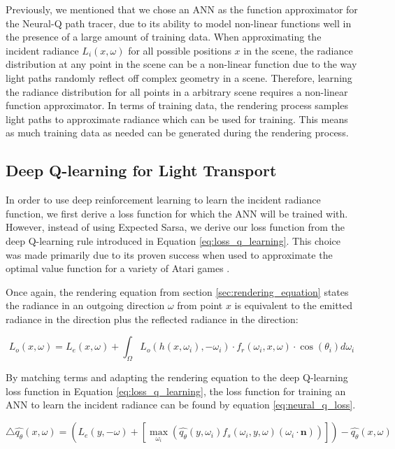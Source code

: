 \documentclass[../dissertation.tex]{subfiles}
\begin{document}
Previously, we mentioned that we chose an ANN as the function approximator for the Neural-Q path tracer, due to its ability to model non-linear functions well in the presence of a large amount of training data. When approximating the incident radiance $L_i(x, \omega)$ for all possible positions $x$ in the scene, the radiance distribution at any point in the scene can be a non-linear function due to the way light paths randomly reflect off complex geometry in a scene. Therefore, learning the radiance distribution for all points in a arbitrary scene requires a non-linear function approximator. In terms of training data, the rendering process samples light paths to approximate radiance which can be used for training. This means as much training data as needed can be generated during the rendering process.

\subsection{Deep Q-learning for Light Transport}

In order to use deep reinforcement learning to learn the incident radiance function, we first derive a loss function for which the ANN will be trained with. However, instead of using Expected Sarsa, we derive our loss function from the deep Q-learning rule introduced in Equation \ref{eq:loss_q_learning}. This choice was made primarily due to its proven success when used to approximate the optimal value function for a variety of Atari games \cite{mnih2013playing}.

Once again, the rendering equation from section \ref{sec:rendering_equation} states the radiance in an outgoing direction $\omega$ from point $x$ is equivalent to the emitted radiance in the direction plus the reflected radiance in the direction:

\begin{equation}
L_o(x, \omega) = L_e(x,\omega)  + \int_\Omega L_o(h(x, \omega_i), -\omega_i)  \cdot f_r(\omega_i, x, \omega) \cdot \cos(\theta_i) d\omega_i \nonumber
\end{equation}

By matching terms and adapting the rendering equation to the deep Q-learning loss function in Equation \ref{eq:loss_q_learning}, the loss function for training an ANN to learn the incident radiance can be found by equation \ref{eq:neural_q_loss}. 

\begin{equation}
\triangle \hat{q_\theta}(x, \omega) = \left( L_e(y, -\omega) + \left[ \max_{\omega_i} \left(\hat{q_\theta}(y, \omega_i) f_s(\omega_i, y, \omega) (\omega_i \cdot \mathbf{n}) \right) \right] \right) - \hat{q_\theta}(x, \omega)
\label{eq:neural_q_loss}
\end{equation}
\end{document}
